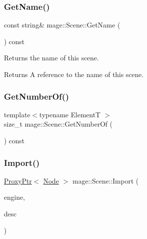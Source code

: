 \hypertarget{classmage_1_1_scene_a6afd25c30d08eb579eb430af49cf8fc0}{}\label{classmage_1_1_scene_a6afd25c30d08eb579eb430af49cf8fc0} 
\subsubsection{\texorpdfstring{Get\+Name()}{GetName()}}
{\footnotesize\ttfamily const string\& mage\+::\+Scene\+::\+Get\+Name (\begin{DoxyParamCaption}{ }\end{DoxyParamCaption}) const\hspace{0.3cm}{\ttfamily [noexcept]}}

Returns the name of this scene.

\begin{DoxyReturn}{Returns}
A reference to the name of this scene. 
\end{DoxyReturn}
\hypertarget{classmage_1_1_scene_a308480749d009dad3a39333fd0c59f2a}{}\label{classmage_1_1_scene_a308480749d009dad3a39333fd0c59f2a} 
\subsubsection{\texorpdfstring{Get\+Number\+Of()}{GetNumberOf()}}
{\footnotesize\ttfamily template$<$typename ElementT $>$ \\
size\+\_\+t mage\+::\+Scene\+::\+Get\+Number\+Of (\begin{DoxyParamCaption}{ }\end{DoxyParamCaption}) const\hspace{0.3cm}{\ttfamily [noexcept]}}

\hypertarget{classmage_1_1_scene_a03490fe422fdfa110a6d3b58c31d1bb4}{}\label{classmage_1_1_scene_a03490fe422fdfa110a6d3b58c31d1bb4} 
\subsubsection{\texorpdfstring{Import()}{Import()}\hspace{0.1cm}{\footnotesize\ttfamily [1/2]}}
{\footnotesize\ttfamily \hyperlink{classmage_1_1_proxy_ptr}{Proxy\+Ptr}$<$ \hyperlink{classmage_1_1_node}{Node} $>$ mage\+::\+Scene\+::\+Import (\begin{DoxyParamCaption}\item[{\hyperlink{classmage_1_1_engine}{Engine} \&}]{engine,  }\item[{const \hyperlink{classmage_1_1rendering_1_1_model_descriptor}{rendering\+::\+Model\+Descriptor} \&}]{desc }\end{DoxyParamCaption})}

